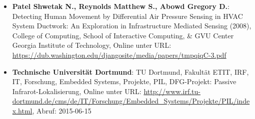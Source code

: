\begin{itemize}[leftmargin=*]
\item[] \textbf{Patel Shwetak N., Reynolds Matthew S., Abowd Gregory D.}: Detecting Human Movement by Differential Air
Pressure Sensing in HVAC System Ductwork: An Exploration in Infrastructure Mediated Sensing (2008), College of Computing, School of Interactive Computing, \& GVU Center Georgia Institute of Technology, Online unter URL: \url{https://dub.washington.edu/djangosite/media/papers/tmpqiqC-3.pdf}
\item[] \textbf{Technische Universität Dortmund}: TU Dortmund, Fakultät ETIT, IRF, IT, Forschung, Embedded Systems,  Projekte, PIL, DFG-Projekt: Passive Infrarot-Lokalisierung, Online unter URL: \url{http://www.irf.tu-dortmund.de/cms/de/IT/Forschung/Embedded_Systems/Projekte/PIL/index.html}, Abruf: 2015-06-15
\end{itemize}